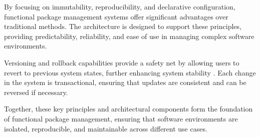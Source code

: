 By focusing on immutability, reproducibility, and declarative configuration, functional package
management systems offer significant advantages over traditional methods. The architecture is
designed to support these principles, providing predictability, reliability, and ease of use in
managing complex software environments.

Versioning and rollback capabilities provide a safety net by allowing users to revert to previous
system states, further enhancing system stability \cite[Chapter 1.5]{dolstraPurelyFunctionalSoftware2006}.
Each change in the system is transactional, ensuring that updates are consistent and can be reversed
if necessary.

Together, these key principles and architectural components form the foundation of functional
package management, ensuring that software environments are isolated, reproducible, and maintainable
across different use cases.
